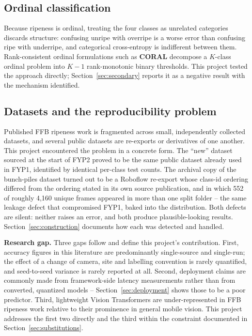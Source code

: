 \documentclass{article}
\begin{document}
\subsection{Ordinal classification}

Because ripeness is ordinal, treating the four classes as unrelated categories discards structure:
confusing unripe with overripe is a worse error than confusing ripe with underripe, and categorical
cross-entropy is indifferent between them. Rank-consistent ordinal formulations such as \textbf{CORAL}
\citep{cao2020coral} decompose a $K$-class ordinal problem into $K{-}1$ rank-monotonic binary thresholds.
This project tested the approach directly; Section~\ref{sec:secondary} reports it as a negative result
with the mechanism identified.

\subsection{Datasets and the reproducibility problem}

Published FFB ripeness work is fragmented across small, independently collected datasets, and several
public datasets are re-exports or derivatives of one another. This project encountered the problem in a
concrete form. The ``new'' dataset sourced at the start of FYP2 proved to be the same public dataset
already used in FYP1, identified by identical per-class test counts. The archival copy of the bunch-piles
dataset turned out to be a Roboflow re-export whose class-id ordering differed from the ordering stated in
its own source publication, and in which 552 of roughly 4{,}160 unique frames appeared in more than one
split folder -- the same leakage defect that compromised FYP1, baked into the distribution. Both defects
are silent: neither raises an error, and both produce plausible-looking results.
Section~\ref{sec:construction} documents how each was detected and handled.

\textbf{Research gap.} Three gaps follow and define this project's contribution. First, accuracy figures
in this literature are predominantly single-source and single-run; the effect of a change of camera, site
and labelling convention is rarely quantified, and seed-to-seed variance is rarely reported at all.
Second, deployment claims are commonly made from framework-side latency measurements rather than from
converted, quantized models -- Section~\ref{sec:deployment} shows those to be a poor predictor. Third,
lightweight Vision Transformers are under-represented in FFB ripeness work relative to their prominence in
general mobile vision. This project addresses the first two directly and the third within the constraint
documented in Section~\ref{sec:substitutions}.
\end{document}
